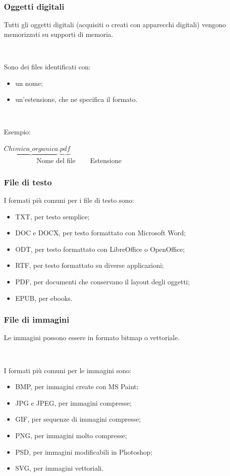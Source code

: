 \documentclass[handout]{beamer}
\begin{document}
\begin{frame}
\frametitle{Oggetti digitali}
Tutti gli oggetti digitali (acquisiti o creati con apparecchi digitali) vengono memorizzati su supporti di memoria.\pause

~

Sono dei \alert{files} identificati con:
\begin{itemize}
  \item un nome;\pause
  \item un'estensione, che ne specifica il formato.\pause
\end{itemize}

~

Esempio:
\begin{center}
  $ \underbrace{Chimica\_organica}.\underbrace{pdf} $\\
  ~~~~~~~~~ Nome del file ~~~ Estensione
\end{center}
\end{frame}




\begin{frame}
\frametitle{File di testo}
I formati più comuni per i file di testo sono:
\begin{itemize}
  \item TXT, per testo semplice;\pause
  \item DOC e DOCX, per testo formattato con Microsoft Word;\pause
  \item ODT, per testo formattato con LibreOffice o OpenOffice;\pause
  \item RTF, per testo formattato su diverse applicazioni;\pause
  \item PDF, per documenti che conservano il layout degli oggetti;\pause
  \item EPUB, per ebooks.
\end{itemize}
\end{frame}


\begin{frame}
\frametitle{File di immagini}
Le immagini possono essere in formato \alert<1>{bitmap} o \alert<1>{vettoriale}.\pause

~

I formati più comuni per le immagini sono:
\begin{itemize}
  \item BMP, per immagini create con MS Paint;\pause
  \item JPG e JPEG, per immagini compresse;\pause
  \item GIF, per sequenze di immagini compresse;\pause
  \item PNG, per immagini molto compresse;\pause
  \item PSD, per immagini modificabili in Photoshop;\pause
  \item SVG, per immagini vettoriali.
\end{itemize}
\end{frame}
\end{document}
